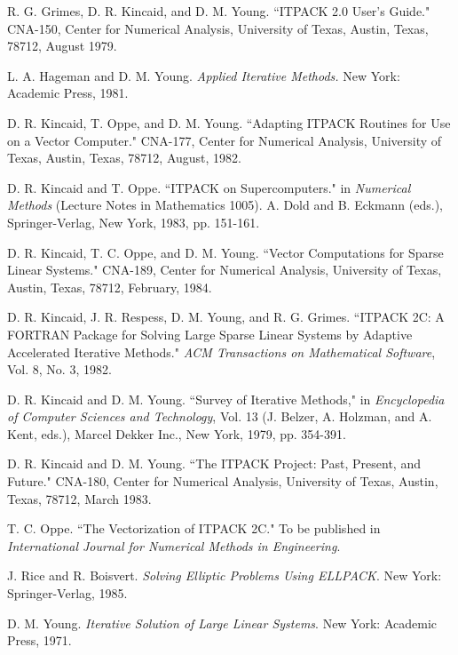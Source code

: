 \begin{thebibliography}{99}
 
  R. G. Grimes, D. R. Kincaid, and D. M. Young.  ``ITPACK 2.0
  User's Guide."  CNA-150, Center for Numerical Analysis,
  University of Texas, Austin, Texas, 78712, August 1979.

  L. A. Hageman and D. M. Young. {\em Applied Iterative 
  Methods.} New York: Academic Press, 1981.
 
  D. R. Kincaid, T. Oppe, and D. M. Young.  ``Adapting ITPACK
  Routines for Use on a Vector Computer."  CNA-177, Center
  for Numerical Analysis, University of Texas, Austin, Texas, 
  78712, August, 1982.
 
  D. R. Kincaid and T. Oppe.  ``ITPACK on Supercomputers."
  in {\em Numerical Methods} (Lecture Notes in Mathematics 1005).
  A. Dold and B. Eckmann (eds.), Springer-Verlag, New York,
  1983, pp. 151-161.
 
  D. R. Kincaid, T. C. Oppe, and D. M. Young.  ``Vector
  Computations for Sparse Linear Systems."  CNA-189, Center
  for Numerical Analysis, University of Texas, Austin, Texas, 
  78712, February, 1984.
 
  D. R. Kincaid, J. R. Respess, D. M. Young, and R. G. Grimes.
  ``ITPACK 2C: A FORTRAN Package for Solving Large Sparse
  Linear Systems by Adaptive Accelerated Iterative Methods."
  {\em ACM Transactions on Mathematical Software}, Vol. 8, 
  No. 3, 1982.
 
  D. R. Kincaid and D. M. Young. ``Survey of Iterative Methods,"
  in {\em Encyclopedia of Computer Sciences and Technology},
  Vol. 13 (J. Belzer, A. Holzman, and A. Kent, eds.), Marcel
  Dekker Inc., New York, 1979, pp. 354-391.
 
  D. R. Kincaid and D. M. Young.  ``The ITPACK Project: Past,
  Present, and Future." CNA-180, Center for Numerical Analysis,
  University of Texas, Austin, Texas, 78712, March 1983.

  T. C. Oppe.  ``The Vectorization of ITPACK 2C."  To be
  published in {\em International Journal for Numerical Methods in
  Engineering}.
 
  J. Rice and R. Boisvert. {\em Solving Elliptic
  Problems Using ELLPACK}. New York: Springer-Verlag, 1985.
 
  D. M. Young.  {\em Iterative Solution of Large Linear Systems}.
  New York: Academic Press, 1971.

\end{thebibliography}
 